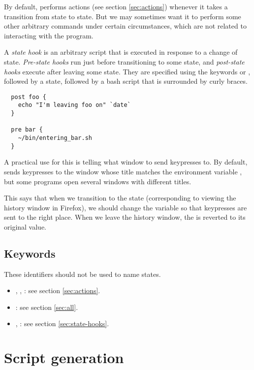 \documentclass[11pt,a4paper]{article}
\begin{document}
By default,  performs actions (see section
\ref{sec:actions}) whenever it takes a transition from state to state.
But we may sometimes want it to perform some other arbitrary commands
under certain circumstances, which are not related to interacting with
the program.

A \emph{state hook} is an arbitrary  script that is executed
in response to a change of state. \emph{Pre-state hooks} run just
before transitioning to some state, and \emph{post-state hooks}
execute after leaving some state. They are specified using the
keywords  or , followed by a state, followed by a
bash script that is surrounded by curly braces.

\begin{lstlisting}
  post foo {
    echo "I'm leaving foo on" `date`
  }

  pre bar {
    ~/bin/entering_bar.sh
  }
\end{lstlisting}

A practical use for this is telling  what window to send
keypresses to. By default,  sends keypresses to the
window whose title matches the environment variable ,
but some programs open several windows with different titles.


This says that when we transition to the state 
(corresponding to viewing the history window in Firefox), we should
change the  variable so that keypresses are sent to
the right place. When we leave the history window, the
 is reverted to its original value.

\subsection{Keywords}

These identifiers should not be used to name states.

\begin{itemize}

  \item {}, , : see section
    \ref{sec:actions}.

  \item {}: see section
    \ref{sec:all}.

  \item {}, : see section
    \ref{sec:state-hooks}.

\end{itemize}

\section{Script generation}
\end{document}
